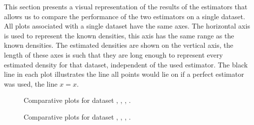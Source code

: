 This section presents a visual representation of the results of the estimators that allows us to compare the performance of the two estimators on a single dataset. All plots associated with a single dataset have the same axes. The horizontal axis is used to represent the known densities, this axis has the same range as the known densities. The estimated densities are shown on the vertical axis, the length of these axes is such that they are long enough to represent every estimated density for that dataset, independent of the used estimator. The black line in each plot illustrates the line all points would lie on if a perfect estimator was used, \ie the line $x = x$.

\begin{figure*}
	\centering
	
	\caption{Comparative plots for dataset \ferdosiOne, \baakmanOne, \baakmanFour, \baakmanFive.}
	\label{fig:4:results:singleSphere}
\end{figure*}



\begin{figure*}
	\centering
	
	\caption{Comparative plots for dataset \ferdosiTwo, \ferdosiThree, \baakmanTwo, \baakmanThree.}
	\label{fig:4:resuts:multiSphere}
\end{figure*}

